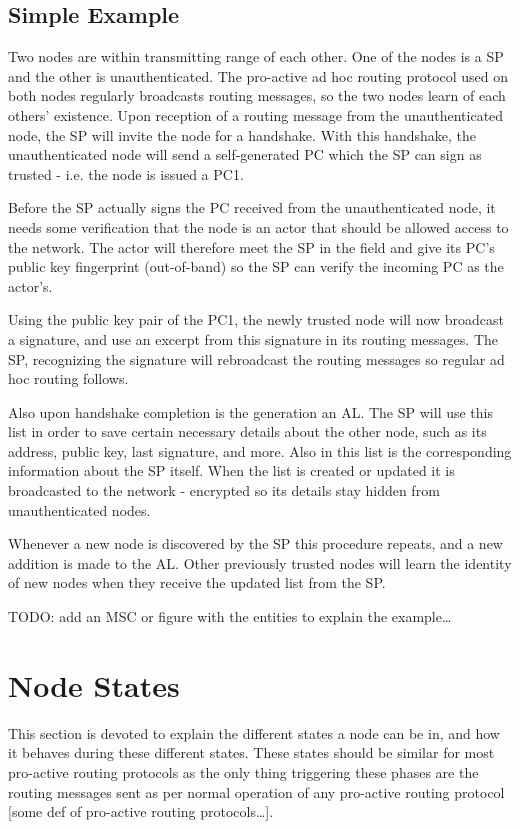\subsection{Simple Example}
Two nodes are within transmitting range of each other. One of the nodes is a
\ac{SP} and the other is unauthenticated. The pro-active ad hoc routing protocol
used on both nodes regularly broadcasts routing messages, so the two nodes learn
of each others' existence. Upon reception of a routing message from the
unauthenticated node, the \ac{SP} will invite the node for a handshake. With
this handshake, the unauthenticated node will send a self-generated \ac{PC}
which the \ac{SP} can sign as trusted - i.e. the node is issued a \ac{PC1}.

Before the \ac{SP} actually signs the \ac{PC} received from the unauthenticated
node, it needs some verification that the node is an actor that should be
allowed access to the network. The actor will therefore meet the \ac{SP} in the
field and give its \ac{PC}'s public key fingerprint (out-of-band) so the \ac{SP}
can verify the incoming \ac{PC} as the actor's.

Using the public key pair of the \ac{PC1}, the newly trusted node will now
broadcast a signature, and use an excerpt from this signature in its routing
messages. The \ac{SP}, recognizing the signature will rebroadcast the routing
messages so regular ad hoc routing follows.

Also upon handshake completion is the generation an \ac{AL}. The \ac{SP} will
use this list in order to save certain necessary details about the other node,
such as its address, public key, last signature, and more. Also in this list is
the corresponding information about the \ac{SP} itself. When the list is created
or updated it is broadcasted to the network - encrypted so its details stay
hidden from unauthenticated nodes.

Whenever a new node is discovered by the \ac{SP} this procedure repeats, and a
new addition is made to the \ac{AL}. Other previously trusted nodes will learn
the identity of new nodes when they receive the updated list from the \ac{SP}.

TODO: add an MSC or figure with the entities to explain the example\ldots

\section{Node States}
This section is devoted to explain the different states a node can be in, and
how it behaves during these different states. These states should be similar for
most pro-active routing protocols as the only thing triggering these phases are
the routing messages sent as per normal operation of any pro-active routing
protocol [some def of pro-active routing protocols\ldots].

